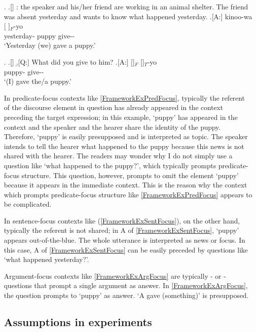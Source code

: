 		\ex. \label{FrameworkExSentFocus}
		\a.[] : the speaker and his/her friend are working in an animal shelter. The friend was absent yesterday and wants to know what happened yesterday.
		\bg.[A:] kinoo-wa [ ]$_{F}$-yo \\
		yesterday- puppy give-- \\
		`Yesterday (we) gave a puppy.'

\ex. \label{FrameworkExArgFocus}\a.[] 
	\b.[Q:] What did you give to him?
	\bg.[A:] []$_{F}$ []$_{T}$-yo \\
			 puppy- give-- \\
			`(I) gave the/a puppy.'

In predicate-focus contexts like \ref{FrameworkExPredFocus},
typically the referent of the discourse element in question has already appeared in the context preceding the target expression;
in this example,
 `puppy' has appeared in the context and the speaker and the hearer share the identity of the puppy.
Therefore,
 `puppy' is easily presupposed and is interpreted as topic.
The speaker intends to tell the hearer what happened to the puppy
because this news is not shared with the hearer.
The readers may wonder
why I do not simply use a question like `what happened to the puppy?',
which typically prompts predicate-focus structure.
This question, however,
prompts to omit the element  `puppy'
because it appears in the immediate context.
This is the reason why
the context which prompts predicate-focus structure like \ref{FrameworkExPredFocus} appears to be complicated.

In sentence-focus contexts like (\ref{FrameworkExSentFocus}),
on the other hand,
typically the referent is not shared;
in A of \ref{FrameworkExSentFocus},
 `puppy' appears out-of-the-blue.
The whole utterance is interpreted as news or focus.
In this case, A of \ref{FrameworkExSentFocus} can be easily preceded by
questions like `what happened yesterday?'.

Argument-focus contexts like \ref{FrameworkExArgFocus}
are typically - or -questions
that prompt a single argument as answer.
In \ref{FrameworkExArgFocus},
the question prompts to  `puppy' as answer.
`A gave (something)' is presupposed.


\subsection{Assumptions in experiments}

